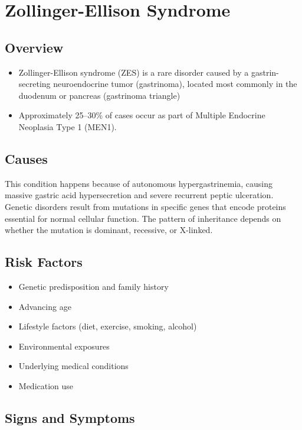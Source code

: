 \chapter{Zollinger-Ellison Syndrome}
\label{sec:Zollinger-Ellison Syndrome}

\section{Overview}


\begin{itemize}[noitemsep]
  \item Zollinger-Ellison syndrome (ZES) is a rare disorder caused by a gastrin-secreting neuroendocrine tumor (gastrinoma), located most commonly in the duodenum or pancreas (gastrinoma triangle)
  \item Approximately 25--30\% of cases occur as part of Multiple Endocrine Neoplasia Type 1 (MEN1).
\end{itemize}
\section{Causes}
This condition happens because of autonomous hypergastrinemia, causing massive gastric acid hypersecretion and severe recurrent peptic ulceration. Genetic disorders result from mutations in specific genes that encode proteins essential for normal cellular function. The pattern of inheritance depends on whether the mutation is dominant, recessive, or X-linked.   
\section{Risk Factors}

\begin{itemize}[noitemsep]
  \item Genetic predisposition and family history
  \item Advancing age
  \item Lifestyle factors (diet, exercise, smoking, alcohol)
  \item Environmental exposures
  \item Underlying medical conditions
  \item Medication use
\end{itemize}
\section{Signs and Symptoms}

